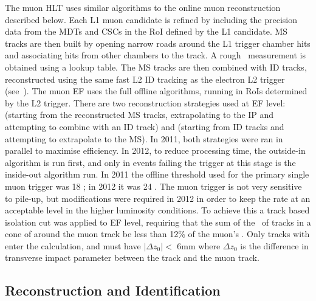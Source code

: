 The muon HLT uses similar algorithms to the online muon reconstruction described
below. Each L1 muon candidate is refined by including the precision
data from the MDTs and CSCs in the RoI defined by the L1 candidate. MS tracks
are then built by opening narrow roads around the L1 trigger chamber hits and
associating hits from other chambers to the track. A rough \pt\ measurement is
obtained using a lookup table. The MS tracks are then combined with ID tracks,
reconstructed using the same fast L2 ID tracking as the electron L2 trigger
(see~). The muon EF uses the full offline algorithms,
running in RoIs determined by the L2 trigger. There are two reconstruction
strategies used at EF level:
 (starting from the reconstructed MS tracks, extrapolating to
the IP and attempting to combine with an ID track) and 
(starting from ID tracks and attempting to extrapolate to the MS). In 2011, both
strategies were ran in parallel to maximise efficiency. In 2012, to reduce
processing time, the outside-in algorithm is run first, and only in events failing
the trigger at this stage is the inside-out algorithm run. In 2011 the offline
threshold used for the primary single muon trigger was 18 \GeV; in 2012 it was 24 \GeV. The muon trigger is
not very sensitive to pile-up, but modifications were required in 2012 in order
to keep the rate at an acceptable level in the higher luminosity conditions. To
achieve this a track based isolation cut was applied to EF level, requiring that
the sum of the \pt\ of tracks in a cone of  around the muon track
be less than 12\% of the muon's \pt. Only tracks with  enter the
calculation, and must have  $|\Delta z_{0}| <$ 6mm where $\Delta z_{0}$ is the
difference in transverse impact parameter between the track and the muon track.

\subsection{Reconstruction and Identification}
\label{sec:reco-el-reco}
